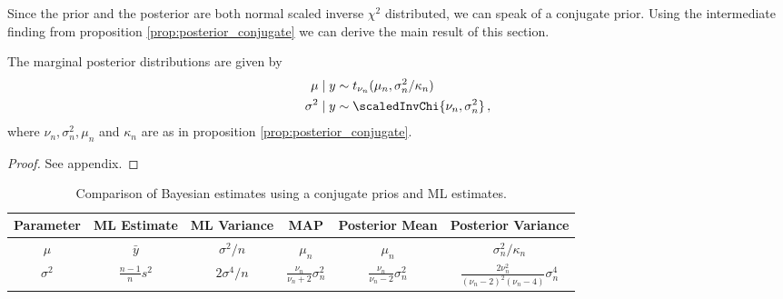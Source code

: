 Since the prior and the posterior are both normal scaled inverse $\chi^2$ distributed, we can speak of a conjugate prior.
Using the intermediate finding from proposition \ref{prop:posterior_conjugate} we can derive the main result of this section.

\begin{proposition}
  The marginal posterior distributions are given by
  \begin{align*}
    \mu \mid y &\sim t_{\nu_n}(\mu_n, \sigma_n^2 / \kappa_n)\\
    \sigma^2 \mid y &\sim \scaledInvChi{\nu_n, \sigma_n^2}\,,
  \end{align*}
  where $\nu_n, \sigma_n^2, \mu_n$ and $\kappa_n$ are as in proposition \ref{prop:posterior_conjugate}.
\end{proposition}
\begin{proof}
  See appendix.
\end{proof}

\begin{table}[ht]
\centering
\def\arraystretch{1.3}
{\small
 \begin{tabular}{c c c c c c}
 Parameter & ML Estimate & ML Variance & MAP & Posterior Mean & Posterior Variance\\
 \hline
 $\mu$ & $\bar{y}$ & $\sigma^2 / n$ & $\mu_n$ & $\mu_n$ & $\sigma_n^2 / \kappa_n$\\
 $\sigma^2$ & $\frac{n-1}{n}s^2$ & $2 \sigma^4 / n$ & $\frac{\nu_n}{\nu_n + 2} \sigma_n^2$ & $\frac{\nu_n}{\nu_n - 2} \sigma_n^2$ & $\frac{2 \nu_n^2}{(\nu_n - 2)^2(\nu_n - 4)} \sigma_n^4$
 \end{tabular}
 }
\caption{{\small Comparison of Bayesian estimates using a conjugate prios and ML estimates.}}
\label{table:comp_conjugate_bay_ml}
\end{table}


